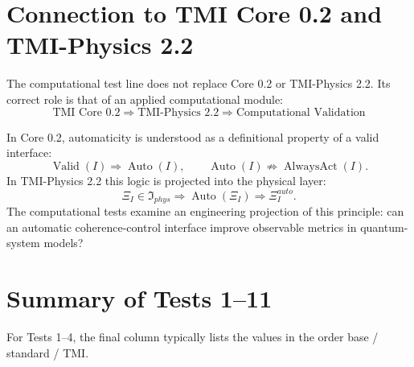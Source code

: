 \documentclass[12pt,a4paper]{article}
\newcommand{\Auto}{\operatorname{Auto}}
\begin{document}
\section{Connection to TMI Core 0.2 and TMI-Physics 2.2}

The computational test line does not replace Core 0.2 or TMI-Physics 2.2. Its correct role is that of an applied computational module:
\[
\boxed{
\text{TMI Core 0.2}
\Rightarrow
\text{TMI-Physics 2.2}
\Rightarrow
\text{Computational Validation}
}
\]

In Core 0.2, automaticity is understood as a definitional property of a valid interface:
\[
\operatorname{Valid}(I)\Rightarrow \Auto(I),
\qquad
\Auto(I)\not\Rightarrow \operatorname{AlwaysAct}(I).
\]
In TMI-Physics 2.2 this logic is projected into the physical layer:
\[
\Xi_I\in\mathfrak I_{phys}
\Rightarrow
\Auto(\Xi_I)
\Rightarrow
\Xi_I^{auto}.
\]
The computational tests examine an engineering projection of this principle: can an automatic coherence-control interface improve observable metrics in quantum-system models?

\section{Summary of Tests 1--11}

For Tests 1--4, the final column typically lists the values in the order base / standard / TMI.
\end{document}
